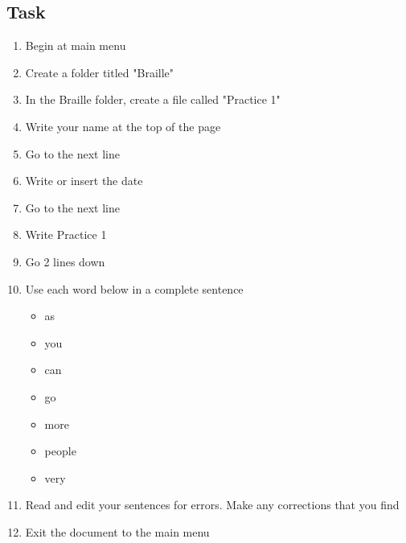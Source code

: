 \documentclass[10pt,letterpaper,twoside]{report}
\begin{document}
\subsection{Task}
\begin{enumerate}
	\item Begin at main menu
	\item Create a folder titled "Braille"
	\item In the Braille folder, create a file called "Practice 1"
	\item Write your name at the top of the page
	\item Go to the next line
	\item Write or insert the date
	\item Go to the next line
	\item Write Practice 1
	\item Go 2 lines down
	\item Use each word below in a complete sentence
	      \begin{itemize}
		      \item as
		      \item you
		      \item can
		      \item go
		      \item more
		      \item people
		      \item very
	      \end{itemize}
	\item Read and edit your sentences for errors. Make any corrections that you find
	\item Exit the document to the main menu
\end{enumerate}

\clearpage
\end{document}
